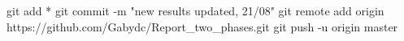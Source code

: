 git add *
git commit -m "new results updated, 21/08"
git remote add origin https://github.com/Gabydc/Report_two_phases.git
git push -u origin master
